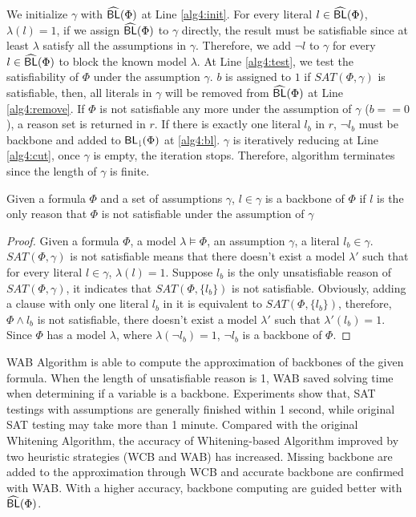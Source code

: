 We initialize $\gamma$ with ${\sf \widehat{BL}}(\Phi)$ at Line \ref{alg4:init}. For every literal $l\in{\sf \widehat{BL}}(\Phi)$, $\lambda(l)=1$, if we assign ${\sf \widehat{BL}}(\Phi)$ to $\gamma$ directly, the result must be satisfiable since at least $\lambda$ satisfy all the assumptions in $\gamma$. Therefore, we add $\neg l$ to $\gamma$ for every $l\in{\sf \widehat{BL}}(\Phi)$ to block the known model $\lambda$. At Line \ref{alg4:test}, we test the satisfiability of $\Phi$ under the assumption $\gamma$. $b$ is assigned to $1$ if $SAT(\Phi,\gamma)$ is satisfiable, then, all literals in $\gamma$ will be removed from ${\sf \widehat{BL}}(\Phi)$ at Line \ref{alg4:remove}. If $\Phi$ is not satisfiable any more under the assumption of $\gamma$ ($b==0$), a reason set is returned in $r$. If there is exactly one literal $l_b$ in $r$, $\neg l_b$ must be backbone and added to ${\sf {BL}_\downharpoonright}(\Phi)$ at \ref{alg4:bl}. $\gamma$ is iteratively reducing at Line \ref{alg4:cut}, once $\gamma$ is empty, the iteration stops. Therefore, algorithm terminates since the length of $\gamma$ is finite.

\begin{theorem}
Given a formula $\Phi$ and a set of assumptions $\gamma$, $l\in\gamma$ is a backbone of $\Phi$ if $l$ is the only reason that $\Phi$ is not satisfiable under the assumption of $\gamma$
\end{theorem}

\begin{proof}
Given a formula $\Phi$, a model $\lambda\models\Phi$, an assumption $\gamma$, a literal $l_b\in\gamma$. $SAT(\Phi,\gamma)$ is not satisfiable means that there doesn't exist a model $\lambda'$ such that for every literal $l\in\gamma$, $\lambda(l)=1$. Suppose $l_b$ is the only unsatisfiable reason of $SAT(\Phi,\gamma)$, it indicates that $SAT(\Phi, \{l_b\})$ is not satisfiable. Obviously, adding a clause with only one literal $l_b$ in it is equivalent to $SAT(\Phi,\{l_b\})$, therefore, $\Phi\wedge l_b$ is not satisfiable, there doesn't exist a model $\lambda'$ such that $\lambda'(l_b)=1$. Since $\Phi$ has a model $\lambda$, where $\lambda(\neg l_b)=1$, $\neg l_b$ is a backbone of $\Phi$.
\end{proof}

WAB Algorithm is able to compute the approximation of backbones of the given formula. When the length of unsatisfiable reason is 1, WAB saved solving time when determining if a variable is a backbone. Experiments show that, SAT testings with assumptions are generally finished within 1 second, while original SAT testing may take more than 1 minute. Compared with the original Whitening Algorithm, the accuracy of Whitening-based Algorithm improved by two heuristic strategies (WCB and WAB) has increased. Missing backbone are added to the approximation through WCB and accurate backbone are confirmed with WAB. With a higher accuracy, backbone computing are guided better with ${\sf \widehat{BL}}(\Phi)$.
